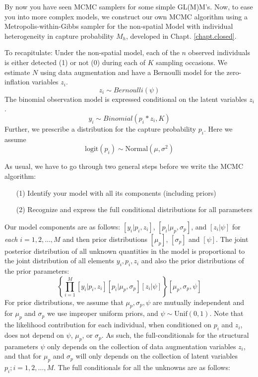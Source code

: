 By now you have seen MCMC samplers for some simple GL(M)M's. Now, to
ease you into more complex models, we construct our own MCMC algorithm
using a Metropolis-within-Gibbs sampler for the non-spatial Model with
individual heterogeneity in capture probability $M_{h}$, developed in
Chapt. \ref{chapt.closed}.

To recapitulate: Under the non-spatial model, each of the $n$ observed
individuals is either detected (1) or not (0) during each of $K$
sampling occasions. We estimate $N$ using data augmentation and have a
Bernoulli model for the zero-inflation variables $z_{i}$. 
\[
z_{i} \sim Bernoulli(\psi)
\]
The binomial
observation model is expressed conditional on the latent variables
$z_{i}$. 
\[
y_i \sim Binomial (p_i * z_i, K)
\]
Further, we prescribe a distribution for the capture
probability $p_{i}$. Here we assume
\[
\mathrm{logit}(p_{i}) \sim \mbox{Normal}(\mu,\sigma^2)
\]

As usual, we have to go through two general steps before we write the MCMC algorithm:
\begin{itemize}
\item[  (1)] Identify your model with all its components (including
    priors)
\item[  (2)] Recognize and express the full conditional distributions for
    all parameters
\end{itemize}
Our model components are as follows: $[y_{i}| p_{i},z_{i}]$,
$[p_{i}|\mu_{p},\sigma_{p}]$, and $[z_{i}|\psi]$
for {\it each} $i=1,2,\ldots,M$ and then prior distributions
$[\mu_{p}]$, $[\sigma_{p}]$ and $[\psi]$.
The joint posterior distribution of all unknown quantities in the model
is proportional to the joint distribution of all elements
$y_{i},p_{i},z_{i}$ and also the prior distributions of the prior parameters:
\[
\left\{ \prod_{i=1}^{M} [y_{i}|p_{i},z_{i}][p_{i}|\mu_{p},\sigma_{p}]
[z_{i}|\psi] \right\} [\mu_{p},\sigma_{p},\psi]
\]
For prior distributions, we assume that $\mu_{p},\sigma_{p}, \psi$ are
mutually independent and for $\mu_{p}$ and $\sigma_{p}$ we use
improper uniform priors, and $\psi \sim \mbox{Unif}(0,1)$.  Note that
the likelihood contribution for each individual, when conditioned on
$p_{i}$ and $z_{i}$, does not depend on $\psi$, $\mu_{p}$, or
$\sigma_{p}$.  As such, the full-conditionals for the structural
parameters $\psi$ only depends on the collection of data augmentation
variables $z_{i}$, and that for $\mu_{p}$ and $\sigma_{p}$ will only
depends on the collection of latent variables $p_{i}; i=1,2,\ldots,M$.
The full conditionals for all the unknowns are as follows:

